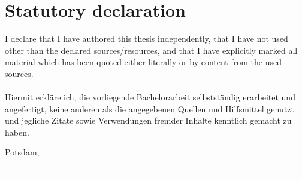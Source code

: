 \section*{Statutory declaration}

I declare that I have authored this thesis independently, that I have not used other than the declared sources/resources, and that I have explicitly marked all material which has been quoted either literally or by content from the used sources. \\ \\
Hiermit erkläre ich, die vorliegende Bachelorarbeit selbstständig erarbeitet und angefertigt, keine anderen als die angegebenen Quellen und Hilfsmittel genutzt und jegliche Zitate sowie Verwendungen fremder Inhalte kenntlich gemacht zu haben.

\vspace{1.5cm}

\noindent
Potsdam, \usvardate{}

\vspace{1.5cm}

\noindent
\begin{tabularx}{\textwidth}{p{6.6cm}p{0.85cm}p{6.6cm}}
	\mkdot&&\mkdot\\
	{\small \theauthor}
\end{tabularx}
